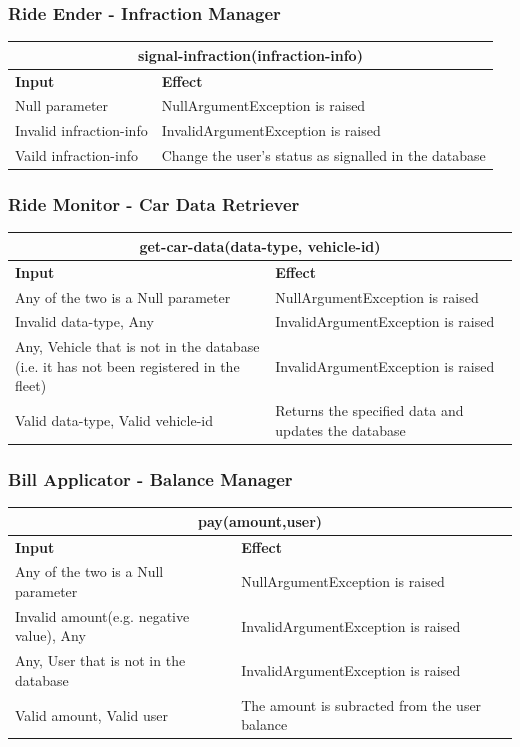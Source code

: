 \documentclass{article}
\begin{document}
\subsubsection{Ride Ender - Infraction Manager}
\begin{tabular}{ |p{5cm}|p{7cm}| }
  \hline
  \multicolumn{2}{|c|}{signal-infraction(infraction-info)} \\
  \hline
  \textbf{Input} & \textbf{Effect} \\
  \hline
  Null parameter & NullArgumentException is raised\\
  \hline
  Invalid infraction-info & InvalidArgumentException is raised \\
  \hline
  Vaild infraction-info & Change the user's status as signalled in the database\\
  \hline
\end{tabular}
\subsubsection{Ride Monitor - Car Data Retriever }
\begin{tabular}{ |p{5cm}|p{7cm}| }
  \hline
  \multicolumn{2}{|c|}{get-car-data(data-type, vehicle-id)} \\
  \hline
  \textbf{Input} & \textbf{Effect} \\
  \hline
  Any of the two is a Null parameter & NullArgumentException is raised\\
  \hline
  Invalid data-type, Any & InvalidArgumentException is raised\\
  \hline
  Any, Vehicle that is not in the database (i.e. it has not been registered in the fleet) & InvalidArgumentException is raised\\
  \hline
   Valid data-type, Valid vehicle-id & Returns the specified data and updates the database\\
  \hline
\end{tabular}
\subsubsection{Bill Applicator - Balance Manager }
\begin{tabular}{ |p{5cm}|p{7cm}| }
  \hline
  \multicolumn{2}{|c|}{pay(amount,user)} \\
  \hline
  \textbf{Input} & \textbf{Effect} \\
  \hline
  Any of the two is a Null parameter & NullArgumentException is raised\\
  \hline
  Invalid amount(e.g. negative value), Any & InvalidArgumentException is raised\\
  \hline
  Any, User that is not in the database & InvalidArgumentException is raised\\
  \hline
   Valid amount, Valid user & The amount is subracted from the user balance\\
  \hline
\end{tabular}
\end{document}
